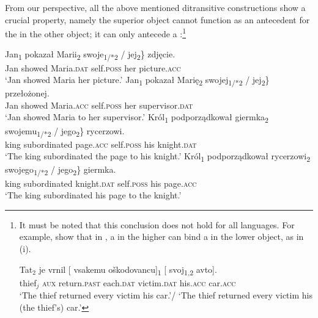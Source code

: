 \documentclass[output=paper,nonflat,colorlinks,citecolor=brown,newtxmath]{langsci/langscibook}
\begin{document}
\noindent From our perspective, all the above mentioned ditransitive constructions show a crucial property, namely the superior object cannot function as an antecedent for the  in the other object; it can only antecede a  :\footnote{\label{fn20}It must be noted that this conclusion does not hold for all  languages. For example, \cite{marvinstegovec2012} show that in , a  in the higher  can bind a  in the lower object, as in (i).

\ea
\gll Tat$_2$ je vrnil [\hspace{-2pt} vsakemu oškodovancu]\textsubscript{1} [\hspace{-2pt} svoj\textsubscript{1,2} avto].\\
thief$_j$ \textsc{aux} return.\textsc{past} {} each.\textsc{dat} victim.\textsc{dat} {} his.\textsc{acc} car.\textsc{acc}\\
\glt `The thief returned every victim his car.'/ `The thief returned every victim his (the thief's) car.'
\z}

\ea \label{ex:witkos:28}
	\ea \label{ex:witkos:28a}
    \gll Jan\textsubscript{1} pokazał Marii\textsubscript{2} \minsp{\{} swoje\textsubscript{1/*2} / jej\textsubscript{2}\} zdjęcie.\\
         Jan showed Maria.\textsc{dat} {} self.\textsc{poss} {} her picture.\textsc{acc}\\
    \glt `Jan showed Maria her picture.'
	\ex \label{ex:witkos:28b}
    \gll Jan\textsubscript{1} pokazał Marię\textsubscript{2} \minsp{\{} swojej\textsubscript{1/*2} / jej\textsubscript{2}\} przełożonej.\\
         Jan showed Maria.\textsc{acc} {} self.\textsc{poss} {} her supervisor.\textsc{dat}\\
    \glt `Jan showed Maria to her supervisor.'
    \ex \label{ex:witkos:28c}
    \gll Król\textsubscript{1} podporządkował giermka\textsubscript{2} \minsp{\{} swojemu\textsubscript{1/*2} / jego\textsubscript{2}\} rycerzowi.\\
         king subordinated page.\textsc{acc} {} self.\textsc{poss} {} his knight.\textsc{dat}\\
    \glt `The king subordinated the page to his knight.'
    \ex\label{ex:witkos:28d}
    \gll Król\textsubscript{1} podporządkował rycerzowi\textsubscript{2} \minsp{\{} swojego\textsubscript{1/*2} / jego\textsubscript{2}\} giermka.\\
         king 	subordinated knight.\textsc{dat} {} self.\textsc{poss} {} his page.\textsc{acc}\\
    \glt `The king subordinated his page to the knight.'
	\z
\z
\end{document}
